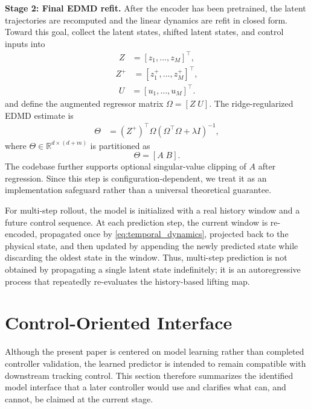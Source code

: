 \documentclass[journal]{IEEEtran}
\begin{document}
\textbf{Stage 2: Final EDMD refit.} After the encoder has been pretrained, the latent trajectories are recomputed and the linear dynamics are refit in closed form. Toward this goal, collect the latent states, shifted latent states, and control inputs into
\begin{align}
    Z &= [z_1,\ldots,z_M]^\top,
\end{align}
\begin{align}
    Z^{+} &= [z_1^{+},\ldots,z_M^{+}]^\top,
\end{align}
\begin{align}
    U &= [u_1,\ldots,u_M]^\top.
\end{align}
and define the augmented regressor matrix $\Omega=[Z\;U]$. The ridge-regularized EDMD estimate is
\begin{equation}
\begin{aligned}
    \Theta &= (Z^{+})^\top \Omega
    \left(\Omega^\top\Omega + \lambda I\right)^{-1},
\end{aligned}
    \label{eq:edmd_solution}
\end{equation}
where $\Theta \in \mathbb{R}^{d\times(d+m)}$ is partitioned as
\begin{equation}
    \Theta = [A\;B].
\end{equation}
The codebase further supports optional singular-value clipping of $A$ after regression. Since this step is configuration-dependent, we treat it as an implementation safeguard rather than a universal theoretical guarantee.

For multi-step rollout, the model is initialized with a real history window and a future control sequence. At each prediction step, the current window is re-encoded, propagated once by \eqref{eq:temporal_dynamics}, projected back to the physical state, and then updated by appending the newly predicted state while discarding the oldest state in the window. Thus, multi-step prediction is not obtained by propagating a single latent state indefinitely; it is an autoregressive process that repeatedly re-evaluates the history-based lifting map.

\section{Control-Oriented Interface}
\label{sec:control}

Although the present paper is centered on model learning rather than completed controller validation, the learned predictor is intended to remain compatible with downstream tracking control. This section therefore summarizes the identified model interface that a later controller would use and clarifies what can, and cannot, be claimed at the current stage.
\end{document}
